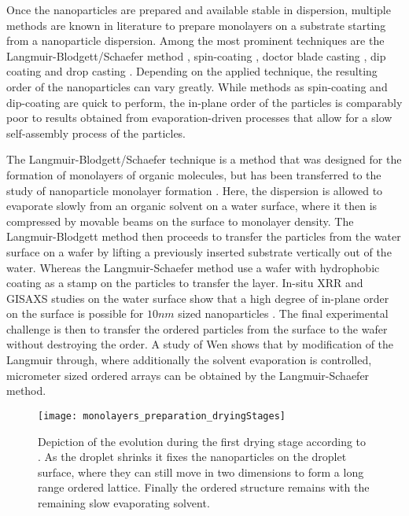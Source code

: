 \documentclass[\main/dresen_thesis.tex]{subfiles}
\begin{document}
  Once the nanoparticles are prepared and available stable in dispersion, multiple methods are known in literature to prepare monolayers on a substrate starting from a nanoparticle dispersion.
  Among the most prominent techniques are the Langmuir-Blodgett/Schaefer method \cite{Ukleev_2017_Selfa, Pauly_2011_Monol, Fried_2001_Order}, spin-coating \cite{Mishra_2012_Selfa}, doctor blade casting \cite{Bodnarchuk_2010_Large}, dip coating \cite{Kim_2002_Multi} and drop casting \cite{Bigioni_2006_Kinet}.
  Depending on the applied technique, the resulting order of the nanoparticles can vary greatly.
  While methods as spin-coating and dip-coating are quick to perform, the in-plane order of the particles is comparably poor to results obtained from evaporation-driven processes that allow for a slow self-assembly process of the particles.

  The Langmuir-Blodgett/Schaefer technique is a method that was designed for the formation of monolayers of organic molecules, but has been transferred to the study of nanoparticle monolayer formation \cite{Heitsch_2010_Gisax, Vorobiev_2015_Subst}.
  Here, the dispersion is allowed to evaporate slowly from an organic solvent on a water surface, where it then is compressed by movable beams on the surface to monolayer density.
  The Langmuir-Blodgett method then proceeds to transfer the particles from the water surface on a wafer by lifting a previously inserted substrate vertically out of the water.
  Whereas the Langmuir-Schaefer method use a wafer with hydrophobic coating as a stamp on the particles to transfer the layer.
  In-situ XRR and GISAXS studies on the water surface show that a high degree of in-plane order on the surface is possible for $10 \unit{nm}$ sized nanoparticles \cite{Vorobiev_2015_Subst}.
  The final experimental challenge is then to transfer the ordered particles from the surface to the wafer without destroying the order.
  A study of Wen \etal \cite{Wen_2011_Ultral} shows that by modification of the Langmuir through, where additionally the solvent evaporation is controlled, micrometer sized ordered arrays can be obtained by the Langmuir-Schaefer method.


  \begin{figure}[tb]
    \centering
    \texttt{[image: monolayers\_preparation\_dryingStages]}
    \caption{\label{fig:monolayers:preparation:dryingConditions:dryingStages} Depiction of the evolution during the first drying stage according to \cite{Bigioni_2006_Kinet}. As the droplet shrinks it fixes the nanoparticles on the droplet surface, where they can still move in two dimensions to form a long range ordered lattice. Finally the ordered structure remains with the remaining slow evaporating solvent.}
  \end{figure}
\end{document}
